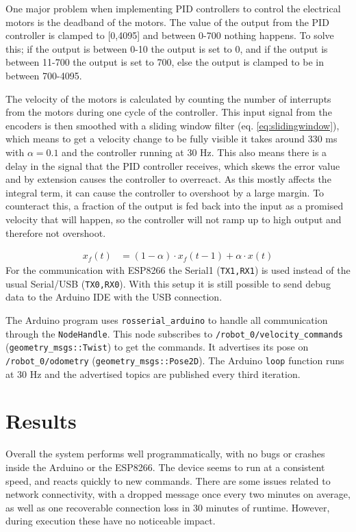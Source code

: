 \documentclass[11pt]{article}
\begin{document}
One major problem when implementing PID controllers to control the electrical
motors is the deadband of the motors. The value of the output from the PID
controller is clamped to [0,4095] and between 0-700 nothing happens. To solve
this; if the output is between 0-10 the output is set to 0, and if the output is
between 11-700 the output is set to 700, else the output is clamped to be in
between 700-4095.\par

The velocity of the motors is calculated by counting the number of interrupts
from the motors during one cycle of the controller. This input signal from the
encoders is then smoothed with a sliding window filter
(eq. \vref{eq:slidingwindow}), which means to get a velocity change to be fully
visible it takes around 330 ms with $\alpha=0.1$ and the controller running at
30 Hz. This also means there is a delay in the signal that the PID controller
receives, which skews the error value and by extension causes the controller to
overreact. As this mostly affects the integral term, it can cause the controller
to overshoot by a large margin. To counteract this, a fraction of the output is
fed back into the input as a promised velocity that will happen, so the
controller will not ramp up to high output and therefore not overshoot.\par

\begin{align}
  x_f(t) &= (1-\alpha) \cdot x_f(t-1)+  \alpha \cdot x(t)  \label{eq:slidingwindow}
\end{align}
For the communication with ESP8266 the Serial1 (\texttt{TX1,RX1}) is used
instead of the usual Serial/USB (\texttt{TX0,RX0}). With this setup it is still
possible to send debug data to the Arduino IDE with the USB connection.\par

The Arduino program uses \texttt{rosserial_arduino} to handle all communication through the \texttt{NodeHandle}. This node subscribes to \texttt{/robot\_0/velocity\_commands}
(\texttt{geometry\_msgs::Twist}) to get the commands. It advertises its pose on
\texttt{/robot\_0/odometry} (\texttt{geometry\_msgs::Pose2D}). The Arduino
\texttt{loop} function runs at 30 Hz and the advertised topics are published
every third iteration.

\section{Results}
Overall the system performs well programmatically, with no bugs or crashes
inside the Arduino or the ESP8266. The device seems to run at a consistent
speed, and reacts quickly to new commands. There are some issues related to
network connectivity, with a dropped message once every two minutes on average,
as well as one recoverable connection loss in 30 minutes of runtime. However,
during execution these have no noticeable impact. \par
\end{document}
